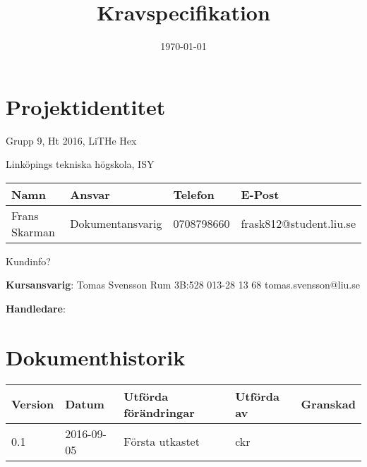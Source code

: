 \documentclass[a4paper,titlepage,12pt]{article}
\title{\textbf{Kravspecifikation}}
\date{\today}
\begin{document}
	\maketitle
	\newpage

	
	\begin{center}


		\section*{Projektidentitet}
		Grupp 9, Ht 2016, LiTHe Hex

		Linköpings tekniska högskola, ISY

		\begin{table}[h]
			\begin{tabular}[pos]{| l | l | l | l |}
				\hline
				\textbf{Namn} & \textbf{Ansvar} & \textbf{Telefon} & \textbf{E-Post} \\ \hline
				Frans Skarman & Dokumentansvarig & 0708798660 & frask812@student.liu.se \\ \hline
			\end{tabular}
		\end{table}


		Kundinfo?

		\textbf{Kursansvarig}: Tomas Svensson Rum 3B:528 013-28 13 68 tomas.svensson@liu.se

		\textbf{Handledare}:


		
		\newpage



		\section*{Dokumenthistorik}
		\begin{table}[h]
			\begin{tabular}[pos]{| l | l | l | l | l |}
				\hline
				\textbf{Version} & \textbf{Datum} & \textbf{Utförda förändringar} 
				& \textbf{Utförda av} & \textbf{Granskad} \\ \hline

				0.1 & 2016-09-05 & Första utkastet & ckr & \\ \hline

			\end{tabular}
		\end{table}

	\end{center}
\end{document}

